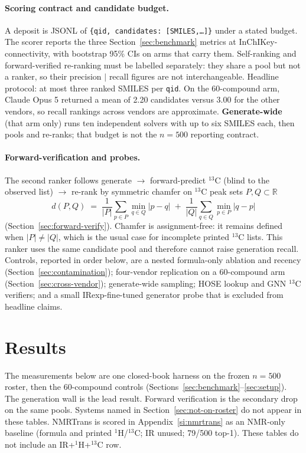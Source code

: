 \documentclass{article}
\begin{document}
\paragraph{Scoring contract and candidate budget.}
A deposit is JSONL of \texttt{\{qid, candidates: [SMILES,\ldots]\}} under a
stated budget.
The scorer reports the three Section~\ref{sec:benchmark} metrics at
InChIKey-connectivity, with bootstrap 95\% CIs on arms that carry them.
Self-ranking and forward-verified re-ranking must be labelled separately:
they share a pool but not a ranker, so their precision $|$ recall figures
are not interchangeable.
Headline protocol: at most three ranked SMILES per \texttt{qid}.
On the 60-compound arm, Claude Opus 5 returned a mean of 2.20 candidates versus 3.00
for the other vendors, so recall rankings across vendors are approximate.
\textbf{Generate-wide} (that arm only) runs ten independent solvers with
up to six SMILES each, then pools and re-ranks; that budget is not the
$n{=}500$ reporting contract.

\paragraph{Forward-verification and probes.}
The second ranker follows generate $\to$ forward-predict $^{13}$C (blind
to the observed list) $\to$ re-rank by symmetric chamfer on $^{13}$C peak
sets $P,Q\subset\mathbb{R}$
\begin{equation}
\label{eq:chamfer}
d(P,Q)
\;=\;
\frac1{|P|}\sum_{p\in P}\min_{q\in Q}|p-q|
\;+\;
\frac1{|Q|}\sum_{q\in Q}\min_{p\in P}|q-p|
\end{equation}
(Section~\ref{sec:forward-verify}).
Chamfer is assignment-free: it remains defined when $|P|\neq|Q|$, which
is the usual case for incomplete printed $^{13}$C lists.
This ranker uses the same candidate pool and therefore cannot raise
generation recall.
Controls, reported in order below, are a nested formula-only ablation and recency
(Section~\ref{sec:contamination}); four-vendor replication on a
60-compound arm (Section~\ref{sec:cross-vendor}); generate-wide sampling;
HOSE lookup and GNN $^{13}$C verifiers; and a small IRexp-fine-tuned
generator probe that is excluded from headline claims.

\section{Results}
\label{sec:results}
The measurements below are one closed-book harness on the frozen
$n{=}500$ roster, then the 60-compound controls
(Sections~\ref{sec:benchmark}--\ref{sec:setup}).
The generation wall is the lead result.
Forward verification is the secondary drop on the same pools.
Systems named in Section~\ref{sec:not-on-roster} do not appear in these tables.
NMRTrans is scored in Appendix~\ref{si:nmrtrans} as an NMR-only baseline (formula and printed
$^1$H/$^{13}$C; IR unused; 79/500 top-1).
These tables do not include an IR+$^1$H+$^{13}$C row.
\end{document}
